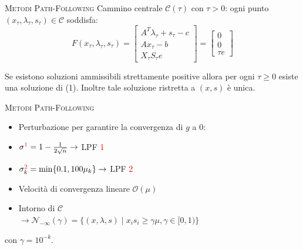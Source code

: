 \begin{frame}[t]{\textsc{\LARGE \textcolor{burntumber}{Metodi Path-Following}}}
	Cammino centrale $\mathcal{C}(\tau)$ con $\tau  > 0$: ogni punto $(x_{\tau}, \lambda_{\tau}, s_{\tau})\in \mathcal{C}$ soddisfa:
\begin{equation}\label{Ftao}\tag{1}
\mathit{F}(x_{\tau},\lambda_{\tau},s_{\tau})= \begin{bmatrix}
A^{T}\lambda_{\tau}+s_{\tau}-c \\Ax_{\tau}-b \\X_{\tau}S_{\tau}e
\end{bmatrix}=\begin{bmatrix}0\\0\\ \tau e \end{bmatrix}
\end{equation}

\begin{theorem}
	Se esistono soluzioni ammissibili strettamente positive allora per ogni $\tau\geq0$ esiste una soluzione di (1). Inoltre tale
	soluzione ristretta a $(x, s)$ è unica.
\end{theorem}
\end{frame}


\begin{frame}{\textsc{\LARGE \textcolor{burntumber}{Metodi Path-Following}}}

\begin{itemize}
	\item Perturbazione per garantire la convergenza di $g$ a $0$:
\end{itemize}
\pause
{}
\pause
\begin{itemize}
	\item[] \;\;\;\;\;\;\;\;\;\;\;\;\;\;\;\;\;\;\;\;\;\;\;\;\;$\sigma^{\textcolor{red}{1}} = 1 -\frac{1}{2\sqrt{n}}\rightarrow$\textrm{ LPF \textcolor{red}{1}}\pause
	\item[] \;\;\;\;\;\;\;\;\;\;\;\;\;\;\;\;\;\;\;\;\;\;\;\;\;$\sigma^{\textcolor{red}{2}}_{k} = \min\{0.1, 100\mu_{k}\}\rightarrow$\textrm{ LPF \textcolor{red}{2}}\pause	
\end{itemize}
\begin{itemize}
\item Velocità di convergenza lineare $\mathcal{O}(\mu)$
\pause
\item Intorno di $\mathcal{C}$\\ 
$\rightarrow \mathcal{N}_{-\infty}(\gamma) =\{ (x, \lambda,s)\;|\; x_{i}s_{i} \geq \gamma \mu,  \gamma \in [0,1)\}$
\end{itemize}
\;\;\;\;\;\;\;\;con $\gamma=10^{-k}$.
\end{frame}

